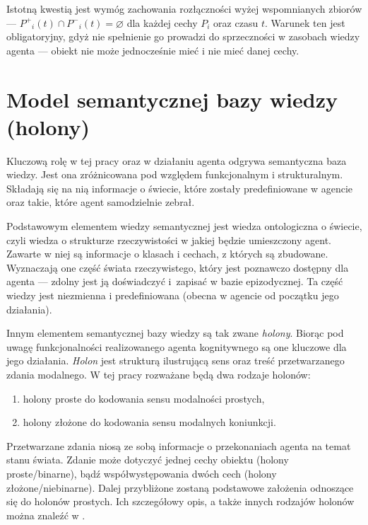 Istotną kwestią jest wymóg zachowania rozłączności wyżej wspomnianych zbiorów --- 
$ P^+{}_i(t) \cap P^-{}_i(t) = \varnothing $
dla każdej cechy $ P_i $ oraz czasu $ t $. Warunek ten jest obligatoryjny, gdyż nie spełnienie go prowadzi do sprzeczności w zasobach wiedzy agenta --- obiekt nie może jednocześnie mieć i nie mieć danej cechy.


\section{Model semantycznej bazy wiedzy (holony)}

Kluczową rolę w tej pracy oraz w działaniu agenta odgrywa semantyczna baza wiedzy. Jest ona zróżnicowana pod względem funkcjonalnym i strukturalnym. Składają się na nią informacje o świecie, które zostały predefiniowane w agencie oraz takie, które agent samodzielnie zebrał.

Podstawowym elementem wiedzy semantycznej jest wiedza ontologiczna o świecie, czyli wiedza o strukturze rzeczywistości w jakiej będzie umieszczony agent. Zawarte w niej są informacje o klasach i cechach, z których są zbudowane. Wyznaczają one część świata rzeczywistego, który jest poznawczo dostępny dla agenta --- zdolny jest ją doświadczyć i~zapisać w bazie epizodycznej. Ta część wiedzy jest niezmienna i predefiniowana (obecna w agencie od początku jego działania).

Innym elementem semantycznej bazy wiedzy są tak zwane \textit{holony}. Biorąc pod uwagę funkcjonalności realizowanego agenta kognitywnego są one kluczowe dla jego działania. \textit{Holon} jest strukturą ilustrującą sens oraz treść przetwarzanego zdania modalnego. W tej pracy rozważane będą dwa rodzaje holonów: 

\begin{enumerate}
	\setlength{\itemindent}{.5in}
	\item holony proste do kodowania sensu modalności prostych,
	\item holony złożone do kodowania sensu modalnych koniunkcji.
\end{enumerate}

Przetwarzane zdania niosą ze sobą informacje o przekonaniach agenta na temat stanu świata. Zdanie może dotyczyć jednej cechy obiektu (holony proste/binarne), bądź współwystępowania dwóch cech (holony złożone/niebinarne). Dalej przybliżone zostaną podstawowe założenia odnoszące się do holonów prostych. Ich szczegółowy opis, a także innych rodzajów holonów można znaleźć w \cite{raport}.

